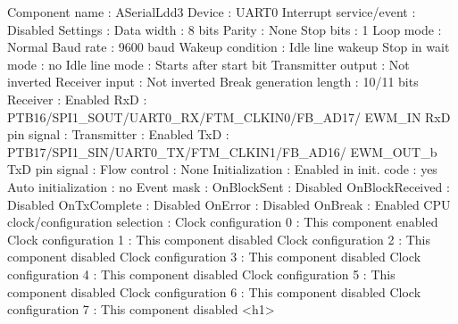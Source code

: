\begin{DoxyCode}
            Component name                                 : ASerialLdd3
            Device                                         : UART0
            Interrupt service/\textcolor{keyword}{event}                        : Disabled
            Settings                                       : 
              Data width                                   : 8 bits
              Parity                                       : None
              Stop bits                                    : 1
              Loop mode                                    : Normal
              Baud rate                                    : 9600 baud
              Wakeup condition                             : Idle line wakeup
              Stop in wait mode                            : no
              Idle line mode                               : Starts after start bit
              Transmitter output                           : Not inverted
              Receiver input                               : Not inverted
              Break generation length                      : 10/11 bits
              Receiver                                     : Enabled
                RxD                                        : PTB16/SPI1\_SOUT/UART0\_RX/FTM\_CLKIN0/FB\_AD17/
      EWM\_IN
                RxD pin signal                             : 
              Transmitter                                  : Enabled
                TxD                                        : PTB17/SPI1\_SIN/UART0\_TX/FTM\_CLKIN1/FB\_AD16/
      EWM\_OUT\_b
                TxD pin signal                             : 
              Flow control                                 : None
            Initialization                                 : 
              Enabled in init. code                        : yes
              Auto initialization                          : no
              Event mask                                   : 
                OnBlockSent                                : Disabled
                OnBlockReceived                            : Disabled
                OnTxComplete                               : Disabled
                OnError                                    : Disabled
                OnBreak                                    : Enabled
            CPU clock/configuration selection              : 
              Clock configuration 0                        : This component enabled
              Clock configuration 1                        : This component disabled
              Clock configuration 2                        : This component disabled
              Clock configuration 3                        : This component disabled
              Clock configuration 4                        : This component disabled
              Clock configuration 5                        : This component disabled
              Clock configuration 6                        : This component disabled
              Clock configuration 7                        : This component disabled
<h1>
\end{DoxyCode}

